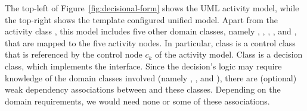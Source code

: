 %
%
%
%
%

%
The top-left of Figure~\ref{fig:decisional-form} shows the UML activity model, while the top-right shows the template configured unified model. Apart from the activity class , this model includes five other domain classes, namely , , , , and , that are mapped to the five activity nodes. In particular, class  is a control class that is referenced by the control node $c_k$ of the activity model. 
Class  is a decision class, which implements the  interface.
%
Since the decision's logic may require knowledge of the domain classes involved (namely , , and ), there are (optional) weak dependency associations between  and these classes. Depending on the domain requirements, we would need none or some of these associations.

